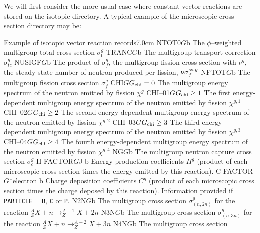 \vskip 0.2cm

We will first consider the more usual case where constant vector reactions are
stored on the isotopic directory. A typical example of the microscopic cross
section directory may be:

\begin{DescriptionEnregistrement}{Example of isotopic vector reaction records}{7.0cm}
\label{tabl:tabiso4}
\RealEnr
  {NTOT0}{$G$}{b}
  {The $\phi$--weighted multigroup total cross section $\sigma_0^{g}$}
\RealEnr
  {TRANC}{$G$}{b} 
  {The multigroup transport correction $\sigma_{tc}^{g}$}
\RealEnr
  {NUSIGF}{$G$}{b} 
  {The product of $\sigma_{f}^{g}$, the multigroup fission cross section with
   $\nu^{g}$, the steady-state number of neutron produced per fission,
   $\nu\sigma_{f}^{{\rm ss},g}$}
\RealEnr
  {NFTOT}{$G$}{b}
  {The multigroup fission cross section $\sigma_{f}^{g}$}
\OptRealEnr
  {CHI}{$G$}{$G_{\rm chi}=0$}{}
  {The multigroup energy spectrum of the neutron emitted by fission $\chi^{g}$}
\OptRealEnr
  {CHI--01}{$G$}{$G_{\rm chi}\ge 1$}{}
  {The first energy-dependent multigroup energy spectrum of the neutron emitted by fission $\chi^{g,1}$}
\OptRealEnr
  {CHI--02}{$G$}{$G_{\rm chi}\ge 2$}{}
  {The second energy-dependent multigroup energy spectrum of the neutron emitted by fission $\chi^{g,2}$}
\OptRealEnr
  {CHI--03}{$G$}{$G_{\rm chi}\ge 3$}{}
  {The third energy-dependent multigroup energy spectrum of the neutron emitted by fission $\chi^{g,3}$}
\OptRealEnr
  {CHI--04}{$G$}{$G_{\rm chi}\ge 4$}{}
  {The fourth energy-dependent multigroup energy spectrum of the neutron emitted by fission $\chi^{g,4}$}
\RealEnr
  {NG}{$G$}{b} 
  {The multigroup neutron capture cross section $\sigma_{c}^{g}$}
\RealEnr
  {H-FACTOR}{$G$}{J b}
  {Energy production coefficients $H^{g}$ (product of each microscopic cross section
  times the energy emitted by this reaction).}
\OptRealEnr
  {C-FACTOR}{$G$}{*}{electron b}
  {Charge deposition coefficients $C^{g}$ (product of each microscopic cross section
  times the charge deposed by this reaction). Information provided if {\tt PARTICLE}$=${\tt B}, {\tt C} or {\tt P}.}
\RealEnr
  {N2N}{$G$}{b} 
  {The multigroup cross section
   $\sigma_{(n,2n)}^{g}$ for the reaction 
   $^{A}_{Z}X+n \to ^{A-1}_{Z}X+2n$}
\RealEnr
  {N3N}{$G$}{b} 
  {The multigroup cross section
   $\sigma_{(n,3n)}^{g}$ for the reaction 
   $^{A}_{Z}X+n \to ^{A-2}_{Z}X+3n$}
\RealEnr
  {N4N}{$G$}{b} 
  {The multigroup cross section
}
\end{DescriptionEnregistrement}
